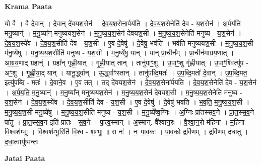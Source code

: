\documentclass[17pt]{extarticle}
\begin{document}
\textbf{Krama Paata} \newline

यो वै । वै दे॒वान् । दे॒वान् दे॑वयश॒सेन॑ । दे॒व॒य॒श॒सेना॒र्पय॑ति । दे॒व॒य॒श॒सेनेति॑ देव - य॒श॒सेन॑ । अ॒र्पय॑ति मनु॒ष्यान्॑ । म॒नु॒ष्या᳚न् मनुष्ययश॒सेन॑ । म॒नु॒ष्य॒य॒श॒सेन॑ देवयश॒सी । म॒नु॒ष्य॒य॒श॒सेनेति॑ मनुष्य - य॒श॒सेन॑ । दे॒व॒य॒श॒स्ये॑व । दे॒व॒य॒श॒सीति॑ देव - य॒श॒सी । ए॒व दे॒वेषु॑ । दे॒वेषु॒ भव॑ति । भव॑ति मनुष्ययश॒सी । म॒नु॒ष्य॒य॒श॒सी म॑नु॒ष्ये॑षु । म॒नु॒ष्य॒य॒श॒सीति॑ मनुष्य - य॒श॒सी । म॒नु॒ष्ये॑षु॒ यान् । यान् प्रा॒चीन᳚म् । प्रा॒चीन॑माग्रय॒णात् । आ॒ग्र॒य॒णाद् ग्रहान्॑ । ग्रहा᳚न् गृह्णी॒यात् । गृ॒ह्णी॒यात् तान् । तानु॑पाꣳ॒॒शु । उ॒पाꣳ॒॒शु गृ॑ह्णीयात् । उ॒पाꣳ॒॒श्वित्यु॑प - अꣳ॒॒शु । गृ॒ह्णी॒या॒द् यान् । यानू॒र्द्ध्वान् । ऊ॒र्द्ध्वाꣳस्तान् । तानु॑पब्दि॒मतः॑ । उ॒प॒ब्दि॒मतो॑ दे॒वान् । उ॒प॒ब्दि॒मत॒ इत्यु॑पब्दि - मतः॑ । दे॒वाने॒व । ए॒व तत् । तद् दे॑वयश॒सेन॑ । दे॒व॒य॒श॒सेना᳚र्पयति । दे॒व॒य॒श॒सेनेति॑ देव - य॒श॒सेन॑ । अ॒र्प॒य॒ति॒ म॒नु॒ष्यान्॑ । म॒नु॒ष्या᳚न् मनुष्ययश॒सेन॑ । म॒नु॒ष्य॒य॒श॒सेन॑ देवयश॒सी । म॒नु॒ष्य॒य॒श॒सेनेति॑ मनुष्य - य॒श॒सेन॑ । दे॒व॒य॒श॒स्ये॑व । दे॒व॒य॒श॒सीति॑ देव - य॒श॒सी । ए॒व दे॒वेषु॑ । दे॒वेषु॑ भवति । भ॒व॒ति॒ म॒नु॒ष्य॒य॒श॒सी । म॒नु॒ष्य॒य॒श॒सी म॑नु॒ष्ये॑षु । म॒नु॒ष्य॒य॒श॒सीति॑ मनुष्य - य॒श॒सी । म॒नु॒ष्ये᳚ष्व॒ग्निः । अ॒ग्निः प्रा॑तस्सव॒ने । प्रा॒त॒स्स॒व॒ने पा॑तु । प्रा॒त॒स्स॒व॒न इति॑ प्रातः - स॒व॒ने । पा॒त्व॒स्मान् । अ॒स्मान्. वै᳚श्वान॒रः । वै॒श्वा॒न॒रो म॑हि॒ना । म॒हि॒ना वि॒श्वश॑म्भूः । वि॒श्वश॑म्भू॒रिति॑ वि॒श्व - श॒म्भूः॒ ॥ स नः॑ । नः॒ पा॒व॒कः । पा॒व॒को द्रवि॑णम् । द्रवि॑णम् दधातु । द॒धा॒त्वायु॑ष्मन्तः \newline

\textbf{Jatai Paata} \newline
\end{document}
